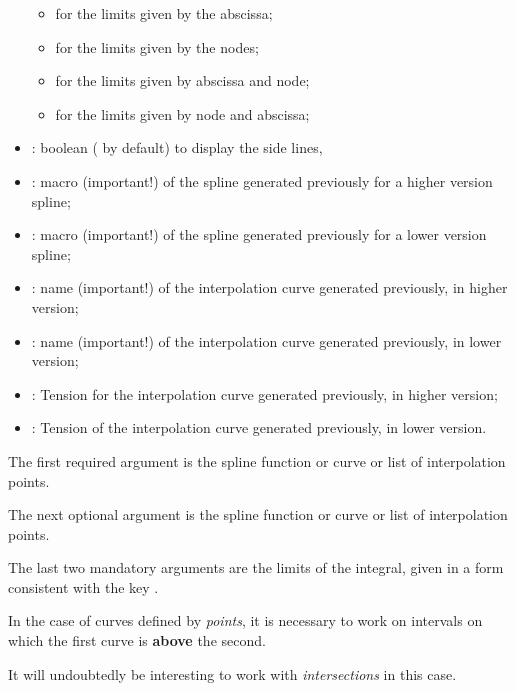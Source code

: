 \documentclass[11pt,a4paper]{ltxdoc}
\begin{document}
\begin{itemize}
	\begin{itemize}
		\item {} for the limits given by the abscissa;
		\item {} for the limits given by the nodes;
		\item {} for the limits given by abscissa and node;
		\item {} for the limits given by node and abscissa;
	\end{itemize}
	\item {}: boolean ( by default) to display the side lines,%
	\item {}: macro (important!) of the spline generated previously for a higher version spline;
	\item {}: macro (important!) of the spline generated previously for a lower version spline;
	\item {}: name (important!) of the interpolation curve generated previously, in higher version;
	\item {}: name (important!) of the interpolation curve generated previously, in lower version;
	\item {}: Tension for the interpolation curve generated previously, in higher version;
	\item {}: Tension of the interpolation curve generated previously, in lower version.
\end{itemize}

\smallskip

The first required argument is the spline function or curve or list of interpolation points.

\smallskip

The next optional argument is the spline function or curve or list of interpolation points.

\smallskip

The last two mandatory arguments are the limits of the integral, given in a form consistent with the key .

\pagebreak

In the case of curves defined by \textit{points}, it is necessary to work on intervals on which the first curve is \textbf{above} the second.

It will undoubtedly be interesting to work with \textit{intersections} in this case.
\end{document}
